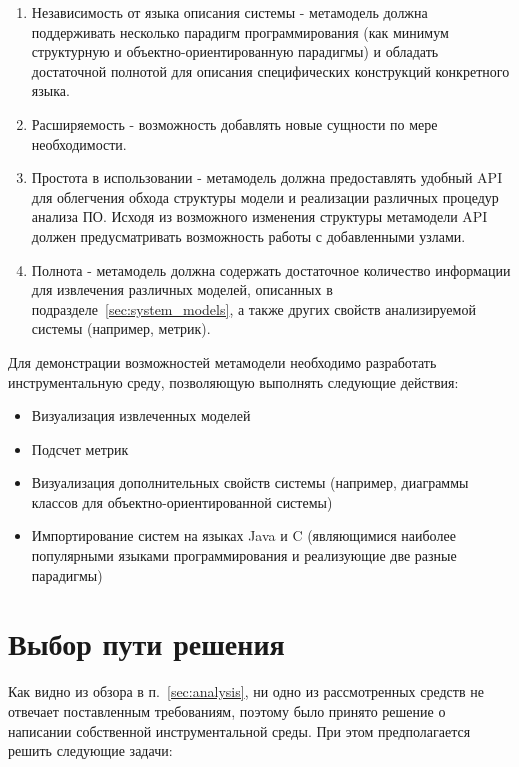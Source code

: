 \begin{enumerate}
    \item Независимость от языка описания системы - метамодель должна
    поддерживать несколько парадигм программирования (как минимум структурную и
    объектно-ориентированную парадигмы) и обладать достаточной полнотой для
    описания специфических конструкций конкретного языка.
    \item Расширяемость - возможность добавлять новые сущности по мере
    необходимости.
    \item Простота в использовании - метамодель должна предоставлять удобный API
    для облегчения обхода структуры модели и реализации различных процедур
    анализа ПО. Исходя из возможного изменения структуры метамодели API должен
    предусматривать возможность работы с добавленными узлами.
    \item Полнота - метамодель должна содержать достаточное количество
    информации для извлечения различных моделей, описанных в
    подразделе~\ref{sec:system_models}, а также других свойств анализируемой
    системы (например, метрик).
\end{enumerate}

Для демонстрации возможностей метамодели необходимо разработать инструментальную
среду, позволяющую выполнять следующие действия:

\begin{itemize}
    \item Визуализация извлеченных моделей
    \item Подсчет метрик
    \item Визуализация дополнительных свойств системы (например, диаграммы
    классов для объектно-ориентированной системы)
    \item Импортирование систем на языках Java и C (являющимися наиболее
    популярными языками программирования и реализующие две разные парадигмы)
\end{itemize}

\section{Выбор пути решения}
\label{sec:tasks}
Как видно из обзора в п.~\ref{sec:analysis}, ни одно из рассмотренных средств не
отвечает поставленным требованиям, поэтому было принято решение о написании
собственной инструментальной среды. При этом предполагается решить следующие
задачи:

